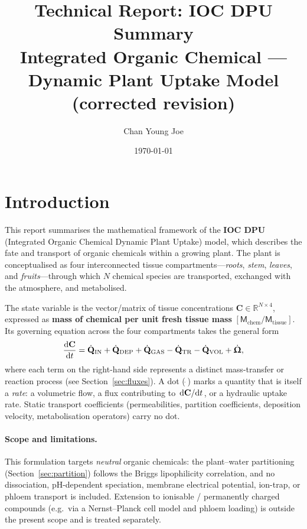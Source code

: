 \documentclass[12pt,a4paper]{article}
\title{\textbf{Technical Report: IOC DPU Summary}\\[6pt]
\large Integrated Organic Chemical --- Dynamic Plant Uptake Model\\[4pt]
\normalsize (corrected revision)}
\author{Chan Young Joe}
\date{\today}
\newcommand{\R}{\mathbb{R}}
\newcommand{\dM}{\mathsf{M}}
\begin{document}
\maketitle

\tableofcontents
\newpage

\section{Introduction}

This report summarises the mathematical framework of the \textbf{IOC DPU} (Integrated Organic Chemical Dynamic Plant Uptake) model, which describes the fate and transport of organic chemicals within a growing plant.  The plant is conceptualised as four interconnected tissue compartments---\emph{roots}, \emph{stem}, \emph{leaves}, and \emph{fruits}---through which $N$ chemical species are transported, exchanged with the atmosphere, and metabolised.

The state variable is the vector/matrix of tissue concentrations $\mathbf{C}\in\R^{N\times4}$, expressed as \textbf{mass of chemical per unit fresh tissue mass} $[\dM_\mathrm{chem}/\dM_\mathrm{tissue}]$.  Its governing equation across the four compartments takes the general form
\begin{equation}\label{eq:governing}
    \dv{\mathbf{C}}{t} = \dot{\mathbf{Q}}_\mathrm{IN} + \dot{\mathbf{Q}}_\mathrm{DEP} + \dot{\mathbf{Q}}_\mathrm{GAS} - \dot{\mathbf{Q}}_\mathrm{TR} - \dot{\mathbf{Q}}_\mathrm{VOL} + \dot{\bm{\Upomega}},
\end{equation}
where each term on the right-hand side represents a distinct mass-transfer or reaction process (see Section~\ref{sec:fluxes}).  A dot ($\dot{\;}$) marks a quantity that is itself a \emph{rate}: a volumetric flow, a flux contributing to $\dv*{\mathbf C}{t}$, or a hydraulic uptake rate.  Static transport coefficients (permeabilities, partition coefficients, deposition velocity, metabolisation operators) carry no dot.

\paragraph{Scope and limitations.}  This formulation targets \emph{neutral} organic chemicals: the plant--water partitioning (Section~\ref{sec:partition}) follows the Briggs lipophilicity correlation, and no dissociation, pH-dependent speciation, membrane electrical potential, ion-trap, or phloem transport is included.  Extension to ionisable / permanently charged compounds (e.g.\ via a Nernst--Planck cell model and phloem loading) is outside the present scope and is treated separately.
\end{document}
